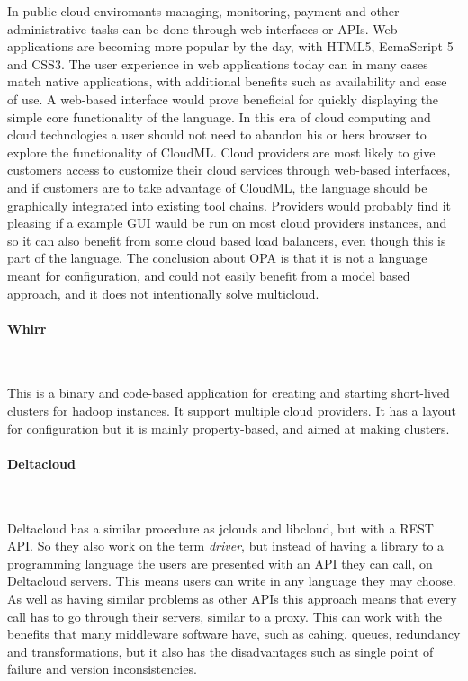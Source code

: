 In public cloud enviromants managing, monitoring, payment and other administrative 
tasks can be done through web interfaces or APIs. 
Web applications are becoming more popular by the day, with HTML5, EcmaScript 5 and CSS3. 
The user experience in web applications today can in many cases match native applications, with additional benefits such as availability and ease of use.
A web-based interface would prove beneficial for quickly displaying the simple core functionality of the language. 
In this era of cloud computing and cloud technologies a user should not need to abandon his or hers browser to explore the functionality of CloudML.
Cloud providers are most likely to give customers access to customize their cloud services through web-based interfaces, 
and if customers are to take advantage of CloudML, the language should be graphically integrated into existing tool chains. 
Providers would probably find it pleasing if a example GUI wauld be run on most cloud providers instances, 
and so it can also benefit from some cloud based load balancers, even though this is part of the language. 
The conclusion about OPA is that it is not a language meant for configuration, and could not easily benefit from a model based approach, 
and it does not intentionally solve multicloud.

\paragraph{Whirr}~\cite{whirr}


This is a binary and code-based application for creating and starting short-lived clusters for hadoop instances.
It support multiple cloud providers. It has a layout for configuration but it is mainly property-based, and aimed at making clusters. 

\paragraph{Deltacloud}~\cite{deltacloud}

Deltacloud has a similar procedure as jclouds and libcloud, but with a REST API. 
So they also work on the term \emph{driver}, but instead of having a library to a programming language the users are presented with an API they can call, 
on Deltacloud servers. This means users can write in any language they may choose. 
As well as having similar problems as other APIs this approach means that every call has to go through their servers, 
similar to a proxy. This can work with the benefits that many middleware software have, such as cahing, queues, 
redundancy and transformations, but it also has the disadvantages such as single point of failure and version inconsistencies.

